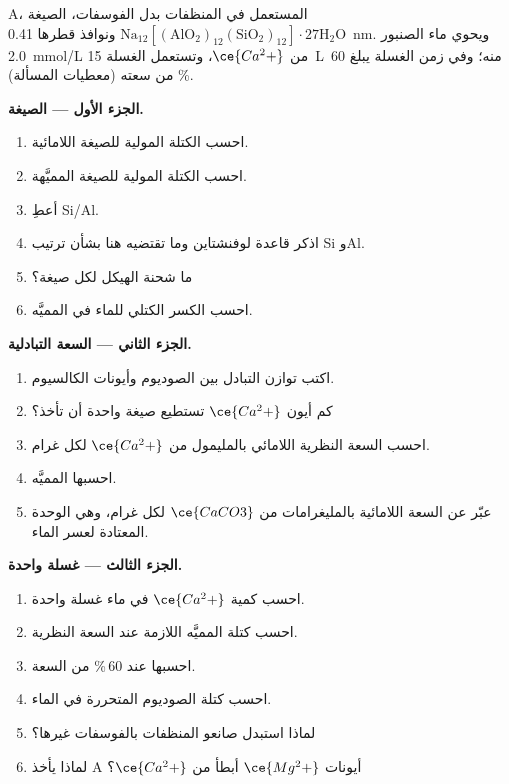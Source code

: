 \begin{problem}
\label{pb:b3:inorganic-materials:1}
 A، المستعمل في المنظفات بدل الفوسفات، الصيغة
$\mathrm{Na_{12}[(AlO_2)_{12}(SiO_2)_{12}]\cdot 27H_2O}$ ونوافذ قطرها \qty{0.41}{nm}. ويحوي ماء الصنبور
\qty{2.0}{mmol/L} من $\ce{Ca^2+}$، وتستعمل الغسلة \qty{15}{L} منه؛ وفي زمن الغسلة يبلغ 
60\,\% من سعته (معطيات المسألة).

\medskip\noindent\textbf{الجزء الأول --- الصيغة.}
\begin{enumerate}
  \item احسب الكتلة المولية للصيغة اللامائية.
  \item احسب الكتلة المولية للصيغة المميَّهة.
  \item أعطِ Si/Al.
  \item اذكر قاعدة لوفنشتاين وما تقتضيه هنا بشأن ترتيب
        Si وAl.
  \item ما شحنة الهيكل لكل صيغة؟
  \item احسب الكسر الكتلي للماء في  المميَّه.
\end{enumerate}

\medskip\noindent\textbf{الجزء الثاني --- السعة التبادلية.}
\begin{enumerate}[resume]
  \item اكتب توازن التبادل بين  الصوديوم وأيونات
        الكالسيوم.
  \item كم أيون $\ce{Ca^2+}$ تستطيع صيغة واحدة أن تأخذ؟
  \item احسب السعة النظرية  اللامائي بالمليمول من $\ce{Ca^2+}$
        لكل غرام.
  \item احسبها  المميَّه.
  \item عبّر عن السعة اللامائية بالمليغرامات من $\ce{CaCO3}$ لكل غرام، وهي الوحدة المعتادة
        لعسر الماء.
\end{enumerate}

\medskip\noindent\textbf{الجزء الثالث --- غسلة واحدة.}
\begin{enumerate}[resume]
  \item احسب كمية $\ce{Ca^2+}$ في ماء غسلة واحدة.
  \item احسب كتلة  المميَّه اللازمة عند السعة النظرية.
  \item احسبها عند 60\,\% من السعة.
  \item احسب كتلة الصوديوم المتحررة في الماء.
  \item لماذا استبدل صانعو المنظفات بالفوسفات غيرها؟
  \item لماذا يأخذ  A أيونات $\ce{Mg^2+}$ أبطأ من $\ce{Ca^2+}$؟
\end{enumerate}


\end{problem}
